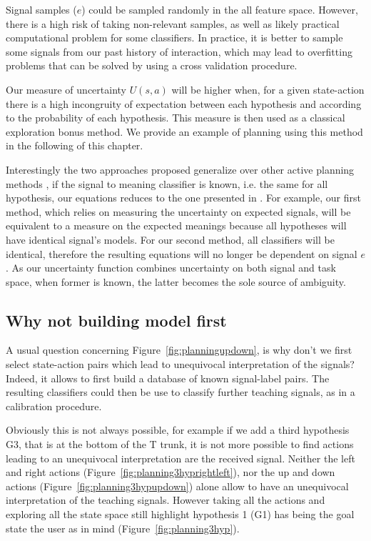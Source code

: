 Signal samples ($e$) could be sampled randomly in the all feature space. However, there is a high risk of taking non-relevant samples, as well as likely practical computational problem for some classifiers. In practice, it is better to sample some signals from our past history of interaction, which may lead to overfitting problems that can be solved by using a cross validation procedure.

Our measure of uncertainty $U(s,a)$ will be higher when, for a given state-action there is a high incongruity of expectation between each hypothesis and according to the probability of each hypothesis. This measure is then used as a classical exploration bonus method. We provide an example of planning using this method in the following of this chapter.

\transition

Interestingly the two approaches proposed generalize over other active planning methods \cite{macl09airl}, if the signal to meaning classifier is known, i.e. the same for all hypothesis, our equations reduces to the one presented in \cite{macl11simul}. For example, our first method, which relies on measuring the uncertainty on expected signals, will be equivalent to a measure on the expected meanings because all hypotheses will have identical signal's models. For our second method, all classifiers will be identical, therefore the resulting equations will no longer be dependent on signal $e$. As our uncertainty function combines uncertainty on both signal and task space, when former is known, the latter becomes the sole source of ambiguity.

\subsection{Why not building model first}

A usual question concerning Figure~\ref{fig:planningupdown}, is why don't we first select state-action pairs which lead to unequivocal interpretation of the signals? Indeed, it allows  to first build a database of known signal-label pairs. The resulting classifiers could then be use to classify further teaching signals, as in a calibration procedure.

Obviously this is not always possible, for example if we add a third hypothesis G3, that is at the bottom of the T trunk, it is not more possible to find actions leading to an unequivocal interpretation are the received signal. Neither the left and right actions (Figure~\ref{fig:planning3hyprightleft}), nor the up and down actions (Figure~\ref{fig:planning3hypupdown}) alone allow to have an unequivocal interpretation of the teaching signals. However taking all the actions and exploring all the state space still highlight hypothesis 1 (G1) has being the goal state the user as in mind (Figure~\ref{fig:planning3hyp}).

